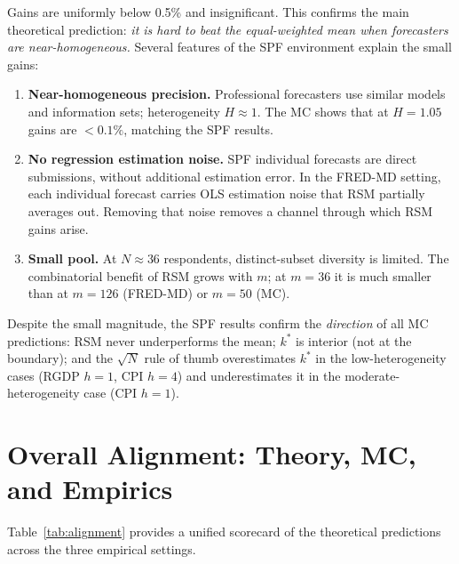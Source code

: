 \documentclass[12pt,a4paper]{article}
\begin{document}
Gains are uniformly below 0.5\% and insignificant. This confirms the
main theoretical prediction: \emph{it is hard to beat the equal-weighted
mean when forecasters are near-homogeneous.} Several features of the SPF
environment explain the small gains:

\begin{enumerate}
\item \textbf{Near-homogeneous precision.} Professional forecasters use
  similar models and information sets; heterogeneity $H \approx 1$. The
  MC shows that at $H=1.05$ gains are $<0.1\%$, matching the SPF results.

\item \textbf{No regression estimation noise.} SPF individual forecasts
  are direct submissions, without additional estimation error. In the
  FRED-MD setting, each individual forecast carries OLS estimation
  noise that RSM partially averages out. Removing that noise removes a
  channel through which RSM gains arise.

\item \textbf{Small pool.} At $N \approx 36$ respondents, distinct-subset
  diversity is limited. The combinatorial benefit of RSM grows with $m$;
  at $m=36$ it is much smaller than at $m=126$ (FRED-MD) or $m=50$ (MC).
\end{enumerate}

Despite the small magnitude, the SPF results confirm the \emph{direction}
of all MC predictions: RSM never underperforms the mean; $k^*$ is interior
(not at the boundary); and the $\sqrt{N}$ rule of thumb overestimates $k^*$
in the low-heterogeneity cases (RGDP $h=1$, CPI $h=4$) and underestimates it
in the moderate-heterogeneity case (CPI $h=1$).

\section{Overall Alignment: Theory, MC, and Empirics}

Table~\ref{tab:alignment} provides a unified scorecard of the theoretical
predictions across the three empirical settings.
\end{document}
